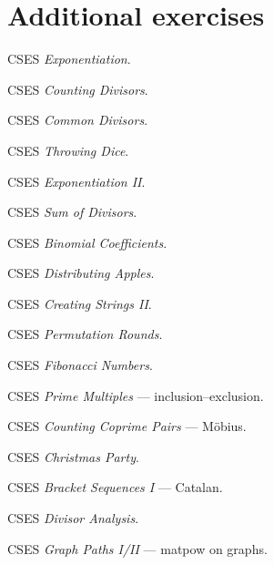 \section{Additional exercises}
\begin{exercise}[easy] CSES \emph{Exponentiation}. \end{exercise}
\begin{exercise}[easy] CSES \emph{Counting Divisors}. \end{exercise}
\begin{exercise}[easy] CSES \emph{Common Divisors}. \end{exercise}
\begin{exercise}[easy] CSES \emph{Throwing Dice}. \end{exercise}
\begin{exercise}[medium] CSES \emph{Exponentiation II}. \end{exercise}
\begin{exercise}[medium] CSES \emph{Sum of Divisors}. \end{exercise}
\begin{exercise}[medium] CSES \emph{Binomial Coefficients}. \end{exercise}
\begin{exercise}[medium] CSES \emph{Distributing Apples}. \end{exercise}
\begin{exercise}[medium] CSES \emph{Creating Strings II}. \end{exercise}
\begin{exercise}[medium] CSES \emph{Permutation Rounds}. \end{exercise}
\begin{exercise}[medium] CSES \emph{Fibonacci Numbers}. \end{exercise}
\begin{exercise}[hard] CSES \emph{Prime Multiples} --- inclusion--exclusion. \end{exercise}
\begin{exercise}[hard] CSES \emph{Counting Coprime Pairs} --- M\"obius. \end{exercise}
\begin{exercise}[hard] CSES \emph{Christmas Party}. \end{exercise}
\begin{exercise}[hard] CSES \emph{Bracket Sequences I} --- Catalan. \end{exercise}
\begin{exercise}[hard] CSES \emph{Divisor Analysis}. \end{exercise}
\begin{exercise}[hard] CSES \emph{Graph Paths I/II} --- matpow on graphs. \end{exercise}

